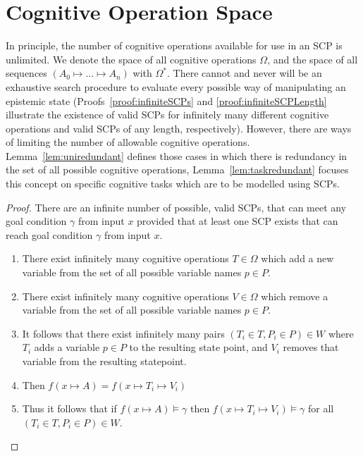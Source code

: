\documentclass[
11pt, %
english, %
singlespacing, %
headsepline, %
]{MastersDoctoralThesis} %
\newtheorem{proof}{Proof}
\begin{document}
\section{Cognitive Operation Space}
In principle, the number of cognitive operations available for use in an SCP is unlimited. We denote the space of all cognitive operations $\Omega$, and the space of all sequences $(A_0 \longmapsto ... \longmapsto A_n)$ with $\Omega^*$. There cannot and never will be an exhaustive search procedure to evaluate every possible way of manipulating an epistemic state (Proofs~\ref{proof:infiniteSCPs} and \ref{proof:infiniteSCPLength} illustrate the existence of valid SCPs for infinitely many different cognitive operations and valid SCPs of any length, respectively). However, there are ways of limiting the number of allowable cognitive operations. Lemma~\ref{lem:uniredundant} defines those cases in which there is redundancy in the set of all possible cognitive operations, Lemma~\ref{lem:taskredundant} focuses this concept on specific cognitive tasks which are to be modelled using SCPs.

\begin{proof} \label{proof:infiniteSCPs}
There are an infinite number of possible, valid SCPs, that can meet any goal condition $\gamma$ from input $x$ provided that at least one SCP exists that can reach goal condition $\gamma$ from input $x$.
\begin{enumerate}
\item There exist infinitely many cognitive operations $T \in \Omega$ which add a new variable from the set of all possible variable names $p \in P$.
\item There exist infinitely many cognitive operations $V \in \Omega$ which remove a variable from the set of all possible variable names  $p \in P$.
\item It follows that there exist infinitely many pairs $(T_i \in T, P_i \in P) \in W$ where $T_i$ adds a variable $p \in P$ to the resulting state point, and $V_i$ removes that variable from the resulting statepoint.
\item Then $f(x \longmapsto A) = f(x \longmapsto T_i \longmapsto V_i)$
\item Thus it follows that if $f(x \longmapsto A)\models \gamma$ then $f(x \longmapsto T_i \longmapsto V_i)\models \gamma$ for all $(T_i \in T, P_i \in P) \in W$.
\end{enumerate}
\end{proof}
\end{document}
